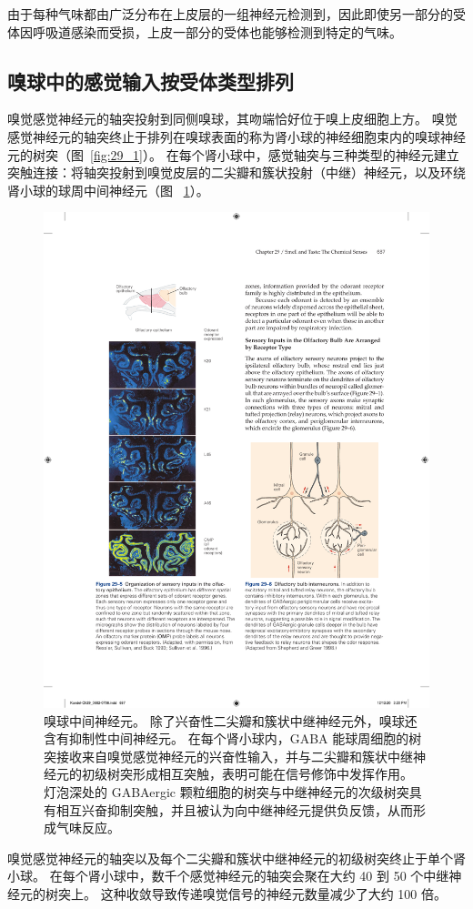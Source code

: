 由于每种气味都由广泛分布在上皮层的一组神经元检测到，因此即使另一部分的受体因呼吸道感染而受损，上皮一部分的受体也能够检测到特定的气味。



\subsection{嗅球中的感觉输入按受体类型排列}

嗅觉感觉神经元的轴突投射到同侧嗅球，其吻端恰好位于嗅上皮细胞上方。
嗅觉感觉神经元的轴突终止于排列在嗅球表面的称为肾小球的神经细胞束内的嗅球神经元的树突（图~\ref{fig:29_1}）。
在每个肾小球中，感觉轴突与三种类型的神经元建立突触连接：将轴突投射到嗅觉皮层的二尖瓣和簇状投射（中继）神经元，以及环绕肾小球的球周中间神经元（图 ~\ref{fig:29_6}）。


\begin{figure}[htbp]
	\centering
	\includegraphics[width=0.5\linewidth]{chap29/fig_29_6}
	\caption{嗅球中间神经元。
		除了兴奋性二尖瓣和簇状中继神经元外，嗅球还含有抑制性中间神经元。
		在每个肾小球内，GABA 能球周细胞的树突接收来自嗅觉感觉神经元的兴奋性输入，并与二尖瓣和簇状中继神经元的初级树突形成相互突触，表明可能在信号修饰中发挥作用。
		灯泡深处的 GABAergic 颗粒细胞的树突与中继神经元的次级树突具有相互兴奋抑制突触，并且被认为向中继神经元提供负反馈，从而形成气味反应\cite{haberly1998synaptic}。}
	\label{fig:29_6}
\end{figure}



嗅觉感觉神经元的轴突以及每个二尖瓣和簇状中继神经元的初级树突终止于单个肾小球。
在每个肾小球中，数千个感觉神经元的轴突会聚在大约 40 到 50 个中继神经元的树突上。
这种收敛导致传递嗅觉信号的神经元数量减少了大约 100 倍。


